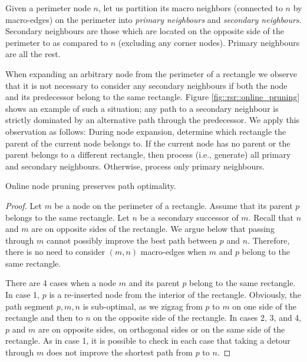 Given a perimeter node $n$, let us partition its macro neighbors 
(connected to $n$ by macro-edges)
on the perimeter into 
\emph{primary neighbours} and \emph{secondary neighbours}.  Secondary neighbours are those
which are located on the opposite side of the perimeter to as compared to $n$
(excluding any corner nodes).  Primary neighbours are all the rest.

When expanding an arbitrary node from the perimeter of a rectangle we observe
that it is not necessary to consider any secondary neighbours if both the node
and its predecessor belong to the same rectangle. Figure \ref{fig::rsr::online_pruning}
shows an example of such a situation; any path to a secondary neighbour
is strictly dominated by an alternative path through the predecessor. 
We apply this observation as follows: {During
node expansion, determine which rectangle the parent of the current node belongs
to.} {If the current node has no parent or the parent belongs to a different
rectangle, then process (i.e., generate) all primary and secondary neighbours.
Otherwise, process only primary neighbours.}

\begin{lemma}
Online node pruning preserves path optimality.
\end{lemma}
\begin{proof}
Let $m$ be a node on the perimeter of a rectangle. Assume that its
parent $p$ belongs to the same rectangle.  Let $n$ be a secondary successor of
$m$.  Recall that $n$ and $m$ are on opposite sides of the rectangle.  We argue
below that passing through $m$ cannot possibly improve the best path between $p$
and $n$.  Therefore, there is no need to consider $(m,n)$ macro-edges when $m$
and $p$ belong to the same rectangle.

There are 4 cases when a node $m$ and its parent $p$ belong to the same
rectangle. In case 1, $p$ is a re-inserted node from the interior of the
rectangle.  Obviously, the path segment $p,m,n$ is sub-optimal, as we zigzag from
$p$ to $m$ on one side of the rectangle and then to $n$ on the opposite side of
the rectangle.  In cases 2, 3, and 4, $p$ and $m$ are on opposite sides, on
orthogonal sides or on the same side of the rectangle. As in case 1, it is
possible to check in each case that taking a detour through $m$ does not improve
the shortest path from $p$ to $n$.
\end{proof}


